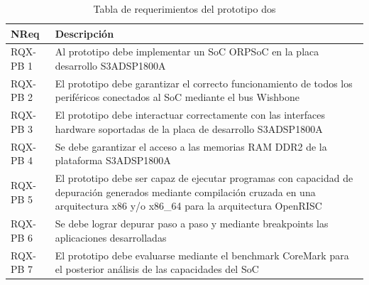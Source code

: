 		\begin{table}[h!]
		\centering
		\begin{longtable}{ p{2.5cm} p{12.5cm} }
		\hline 
		\rowcolor[gray]{0.8} N\textordmasculine Req & Descripción\\
		\hline 		
		RQX-PB 1 & Al prototipo debe implementar un SoC ORPSoC en la placa desarrollo S3ADSP1800A\\ 
		\hline 
		RQX-PB 2 & El prototipo debe garantizar el correcto funcionamiento de todos los periféricos conectados al SoC mediante el bus Wishbone\\ 
		\hline 
		RQX-PB 3 & El prototipo debe interactuar correctamente con las interfaces hardware soportadas de la placa de desarrollo S3ADSP1800A\\ 
		\hline
		RQX-PB 4 & Se debe garantizar el acceso a las memorias RAM DDR2 de la plataforma S3ADSP1800A\\
		\hline
		RQX-PB 5 & El prototipo debe ser capaz de ejecutar programas con capacidad de depuración generados mediante compilación
		cruzada en una arquitectura x86 y/o x86\_64 para la arquitectura OpenRISC\\
		\hline
		RQX-PB 6 & Se debe lograr depurar paso a paso y mediante breakpoints las aplicaciones desarrolladas\\
		\hline
		RQX-PB 7 & El prototipo debe evaluarse mediante el benchmark CoreMark para el posterior análisis de las capacidades del SoC\\
		\hline		
		\end{longtable}
		\caption{Tabla de requerimientos del prototipo dos}
		\label{tab:tdr2}
		\end{table}

